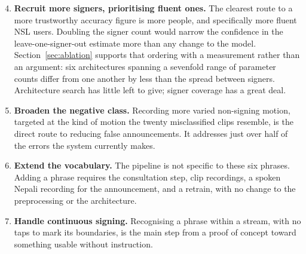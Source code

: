 \begin{enumerate}
    \setcounter{enumi}{3}
    \item \textbf{Recruit more signers, prioritising fluent ones.} The clearest route to a more trustworthy accuracy figure is more people, and specifically more fluent NSL users. Doubling the signer count would narrow the confidence in the leave-one-signer-out estimate more than any change to the model. Section~\ref{sec:ablation} supports that ordering with a measurement rather than an argument: six architectures spanning a sevenfold range of parameter counts differ from one another by less than the spread between signers. Architecture search has little left to give; signer coverage has a great deal.

    \item \textbf{Broaden the negative class.} Recording more varied non-signing motion, targeted at the kind of motion the twenty misclassified clips resemble, is the direct route to reducing false announcements. It addresses just over half of the errors the system currently makes.

    \item \textbf{Extend the vocabulary.} The pipeline is not specific to these six phrases. Adding a phrase requires the consultation step, clip recordings, a spoken Nepali recording for the announcement, and a retrain, with no change to the preprocessing or the architecture.

    \item \textbf{Handle continuous signing.} Recognising a phrase within a stream, with no taps to mark its boundaries, is the main step from a proof of concept toward something usable without instruction.
\end{enumerate}
